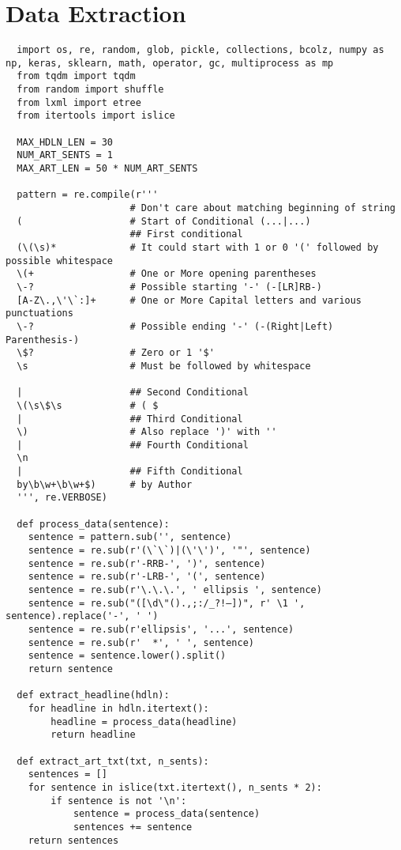 \section{Data Extraction}\label{app:extraction}
\begin{lstlisting}
  import os, re, random, glob, pickle, collections, bcolz, numpy as np, keras, sklearn, math, operator, gc, multiprocess as mp
  from tqdm import tqdm
  from random import shuffle
  from lxml import etree
  from itertools import islice

  MAX_HDLN_LEN = 30
  NUM_ART_SENTS = 1
  MAX_ART_LEN = 50 * NUM_ART_SENTS

  pattern = re.compile(r'''
                      # Don't care about matching beginning of string
  (                   # Start of Conditional (...|...)
                      ## First conditional
  (\(\s)*             # It could start with 1 or 0 '(' followed by possible whitespace
  \(+                 # One or More opening parentheses
  \-?                 # Possible starting '-' (-[LR]RB-)
  [A-Z\.,\'\`:]+      # One or More Capital letters and various punctuations
  \-?                 # Possible ending '-' (-(Right|Left) Parenthesis-)
  \$?                 # Zero or 1 '$'
  \s                  # Must be followed by whitespace

  |                   ## Second Conditional
  \(\s\$\s            # ( $
  |                   ## Third Conditional
  \)                  # Also replace ')' with ''
  |                   ## Fourth Conditional
  \n
  |                   ## Fifth Conditional
  by\b\w+\b\w+$)      # by Author
  ''', re.VERBOSE)

  def process_data(sentence):
    sentence = pattern.sub('', sentence)
    sentence = re.sub(r'(\`\`)|(\'\')', '"', sentence)
    sentence = re.sub(r'-RRB-', ')', sentence)
    sentence = re.sub(r'-LRB-', '(', sentence)
    sentence = re.sub(r'\.\.\.', ' ellipsis ', sentence)
    sentence = re.sub("([\d\"().,;:/_?!—])", r' \1 ', sentence).replace('-', ' ')
    sentence = re.sub(r'ellipsis', '...', sentence)
    sentence = re.sub(r'  *', ' ', sentence)
    sentence = sentence.lower().split()
    return sentence

  def extract_headline(hdln):
    for headline in hdln.itertext():
        headline = process_data(headline)
        return headline

  def extract_art_txt(txt, n_sents):
    sentences = []
    for sentence in islice(txt.itertext(), n_sents * 2):
        if sentence is not '\n':
            sentence = process_data(sentence)
            sentences += sentence
    return sentences


\end{lstlisting}
